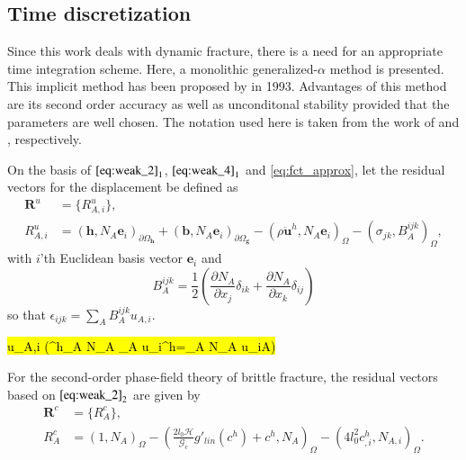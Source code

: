 \subsection{Time discretization} \label{sec:time_discr}
Since this work deals with dynamic fracture, there is a need for an appropriate time integration scheme. Here, a monolithic generalized-$\alpha$ method is presented. This implicit method has been proposed by \citet{10_PF_genAlpha} in 1993. Advantages of this method are its second order accuracy as well as unconditonal stability provided that the parameters are well chosen. The notation used here is taken from the work of \citet{02_PF_HO_brittle} and \citet{01_PF_dyn_brittle}, respectively.

On the basis of $\eqref{eq:weak_2}_{1}$, $\eqref{eq:weak_4}_{1}$ and \eqref{eq:fct_approx}, let the residual vectors for the displacement be defined as
\begin{equation} \label{eq:res_vecs_u}
	\begin{aligned}
		\mathbf{R}^{u}&=\{R_{A,i}^{u}\}, \\
		R_{A,i}^{u} &= \left(\mathbf{h},N_{A}\mathbf{e}_{i}\right)_{\partial\Omega_{\mathbf{h}}} + \left(\mathbf{b},N_{A}\mathbf{e}_{i}\right)_{\partial\Omega_{\mathbf{g}}} - \left(\rho\ddot{\mathbf{u}}^{h},N_{A}\mathbf{e}_{i}\right)_{\Omega}-\left(\sigma_{jk},B_{A}^{ijk}\right)_{\Omega},
	\end{aligned}
\end{equation}
with $i$'th Euclidean basis vector $\mathbf{e}_{i}$ and
\begin{equation}
	B_{A}^{ijk}=\frac{1}{2}\left(\frac{\partial N_{A}}{\partial x_{j}}\delta_{ik}+\frac{\partial N_{A}}{\partial x_{k}}\delta_{ij}\right)
\end{equation}
so that $\epsilon_{ijk}=\sum_{A}B_{A}^{ijk}u_{A,i}$.

\hl{ u_{A,i}  (^{h}\approx\sum_A N_A _A  u_i^h=\sum_A N_A u_{iA})}

For the second-order phase-field theory of brittle fracture, the residual vectors based on $\eqref{eq:weak_2}_{2}$ are given by
\begin{equation} \label{eq:res_vecs_c2}
	\begin{aligned}
		\mathbf{R}^{c}&=\{R_{A}^{c}\}, \\
		R_{A}^{c} &= \left(1,N_{A}\right)_{\Omega} - \left(\frac{2l_{0}\mathcal{H}}{\mathcal{G}_{c}}g'_{lin}\left(c^{h}\right) + c^{h},N_{A}\right)_{\Omega} - \left(4l_{0}^{2}c^{h}_{,i},N_{A,i}\right)_{\Omega}.
	\end{aligned}
\end{equation}

